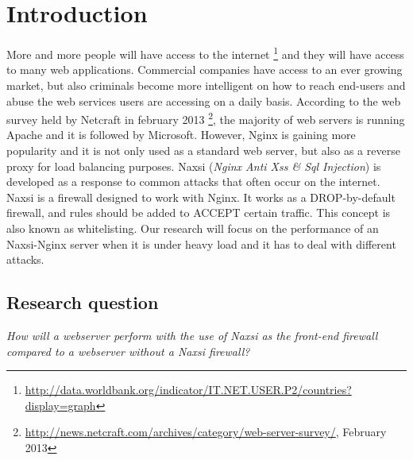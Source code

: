 \documentclass[Introduction]{subfiles}
\begin{document}
\section{Introduction}
\label{sec:Introduction}
More and more people will have access to the internet \footnote{\url{http://data.worldbank.org/indicator/IT.NET.USER.P2/countries?display=graph}} and they will have access to many web applications. Commercial companies have access to an ever growing market, but also criminals become more intelligent on how to reach end-users and abuse the web services users are accessing on a daily basis.
According to the web survey held by Netcraft in february 2013 \footnote{\url{http://news.netcraft.com/archives/category/web-server-survey/}, February 2013}, the majority of web servers is running Apache and it is followed by Microsoft. However, Nginx is gaining more popularity and it is not only used as a standard web server, but also as a reverse proxy for load balancing purposes. Naxsi (\emph{Nginx Anti Xss \& Sql Injection}) is developed as a response to common attacks that often occur on the internet. Naxsi is a firewall designed to work with Nginx. It works as a DROP-by-default firewall, and rules should be added to ACCEPT certain traffic. This concept is also known as whitelisting.
Our research will focus on the performance of an Naxsi-Nginx server when it is under heavy load and it has to deal with different attacks.

\subsection{Research question}
\emph{How will a webserver perform with the use of Naxsi as the front-end firewall compared to a webserver without a Naxsi firewall?}
\end{document}
